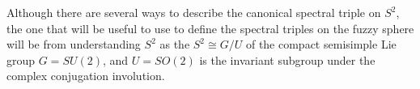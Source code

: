 


Although there are several ways to describe the canonical spectral triple on $S^2$, the one that will be useful to use to define the spectral triples on the fuzzy sphere will be from understanding $S^2$ as the  $S^2 \cong G/U$ of the compact semisimple Lie group $G = SU(2)$, and $U = SO(2)$ is the invariant subgroup under the complex conjugation involution.

